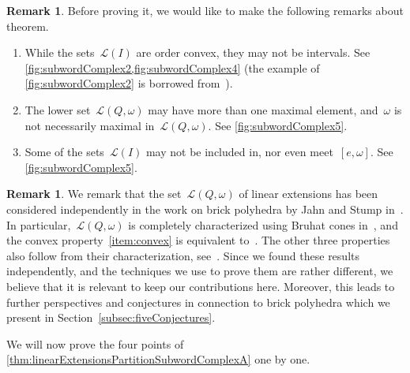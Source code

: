 \documentclass[reqno]{amsart}
\theoremstyle{definition}
\newtheorem{remark}[theorem]{Remark}
\newcommand{\linearExtensions}{\mathcal{L}} %
\begin{document}
\begin{remark}
\label{rem:linearExtensionsPartitionSubwordComplexA}
Before proving it, we would like to make the following remarks about theorem.
\begin{enumerate}
\item While the sets~$\linearExtensions(I)$ are order convex, they may not be intervals. See \cref{fig:subwordComplex2,fig:subwordComplex4} (the example of \cref{fig:subwordComplex2} is borrowed from~\cite[Figure~9]{PilaudStump-brickPolytope}).
\item The lower set~$\linearExtensions(Q,\omega)$ may have more than one maximal element, and~$\omega$ is not necessarily maximal in~$\linearExtensions(Q,\omega)$. See \cref{fig:subwordComplex5}.
\item Some of the sets~$\linearExtensions(I)$ may not be included in, nor even meet~$[e,\omega]$. See \cref{fig:subwordComplex5}.
\end{enumerate}
\end{remark}

\begin{remark}
We remark that the set~$\linearExtensions(Q,\omega)$ of linear extensions has been considered independently in the work on brick polyhedra by Jahn and Stump in~\cite{JahnStump}. In particular,~$\linearExtensions(Q,\omega)$ is completely characterized using Bruhat cones in~\cite[Proposition~4.12]{JahnStump}, and the convex property~\eqref{item:convex} is equivalent to~\cite[Lemma~4.13]{JahnStump}. The other three properties also follow from their characterization, see~\cite[Section~4.2]{JahnStump}.  
Since we found these results independently, and the techniques we use to prove them are rather different, we believe that it is relevant to keep our contributions here. Moreover, this leads to further perspectives and conjectures in connection to brick polyhedra which we present in Section~\ref{subsec:fiveConjectures}. 
\end{remark}

We will now prove the four points of \cref{thm:linearExtensionsPartitionSubwordComplexA} one by one.
\end{document}
